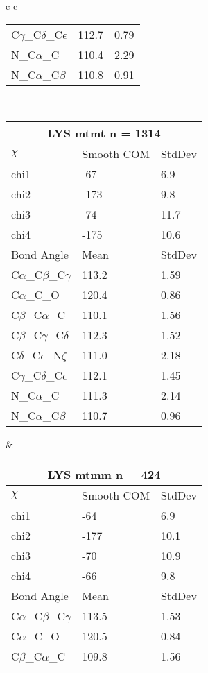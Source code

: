 \begin{longtable}{ c c }
\begin{tabular}{ l l l }
  C$\gamma$\_C$\delta$\_C$\epsilon$ & 112.7 & 0.79\\
  N\_C$\alpha$\_C & 110.4 & 2.29\\
  N\_C$\alpha$\_C$\beta$ & 110.8 & 0.91\\
  \bottomrule
  \end{tabular}
  \\
  \begin{tabular}{ l l l }
  \toprule
  \multicolumn{3}{c}{LYS \textbf{mtmt} n = 1314} \\ \toprule
  $\chi$       & Smooth COM & StdDev \\ \midrule
  chi1 & -67 & 6.9 \\ 
  chi2 & -173 & 9.8 \\ 
  chi3 & -74 & 11.7 \\ 
  chi4 & -175 & 10.6 \\ \midrule
  Bond Angle   & Mean     & StdDev \\ \midrule
  C$\alpha$\_C$\beta$\_C$\gamma$ & 113.2 & 1.59\\
  C$\alpha$\_C\_O & 120.4 & 0.86\\
  C$\beta$\_C$\alpha$\_C & 110.1 & 1.56\\
  C$\beta$\_C$\gamma$\_C$\delta$ & 112.3 & 1.52\\
  C$\delta$\_C$\epsilon$\_N$\zeta$ & 111.0 & 2.18\\
  C$\gamma$\_C$\delta$\_C$\epsilon$ & 112.1 & 1.45\\
  N\_C$\alpha$\_C & 111.3 & 2.14\\
  N\_C$\alpha$\_C$\beta$ & 110.7 & 0.96\\
  \bottomrule
  \end{tabular}
  &
  \begin{tabular}{ l l l }
  \toprule
  \multicolumn{3}{c}{LYS \textbf{mtmm} n = 424} \\ \toprule
  $\chi$       & Smooth COM & StdDev \\ \midrule
  chi1 & -64 & 6.9 \\ 
  chi2 & -177 & 10.1 \\ 
  chi3 & -70 & 10.9 \\ 
  chi4 & -66 & 9.8 \\ \midrule
  Bond Angle   & Mean     & StdDev \\ \midrule
  C$\alpha$\_C$\beta$\_C$\gamma$ & 113.5 & 1.53\\
  C$\alpha$\_C\_O & 120.5 & 0.84\\
  C$\beta$\_C$\alpha$\_C & 109.8 & 1.56\\

\end{tabular}
\end{longtable}
